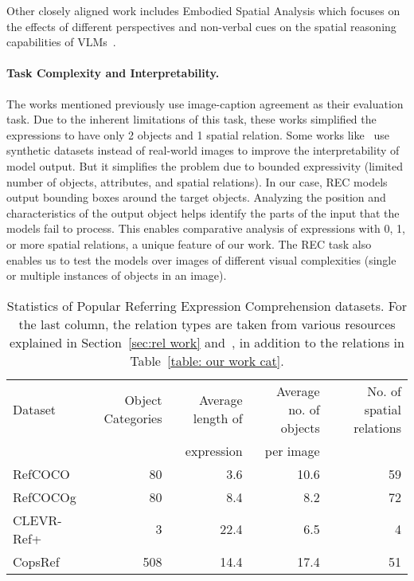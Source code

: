 Other closely aligned work includes Embodied Spatial Analysis which focuses on the effects of different perspectives and non-verbal cues on the spatial reasoning capabilities of VLMs~\cite{islam1,islam2}.
\noindent \paragraph{Task Complexity and Interpretability.} The works mentioned previously use image-caption agreement as their evaluation task. Due to the inherent limitations of this task, these works simplified the expressions to have only 2 objects and 1 spatial relation. Some works like~\cite{clipcdsm,subramaniamreclip,film} use synthetic datasets instead of real-world images to improve the interpretability of model output. But it simplifies the problem due to bounded expressivity (limited number of objects, attributes, and spatial relations). In our case, REC models output bounding boxes around the target objects. Analyzing the position and characteristics of the output object helps identify the parts of the input that the models fail to process. This enables comparative analysis of expressions with 0, 1, or more spatial relations, a unique feature of our work. The REC task also enables us to test the models over images of different visual complexities (single or multiple instances of objects in an image).
\begin{table*}[!ht]
\centering
\begin{tabular}{lrrrr}
\toprule
Dataset & Object Categories & Average length of & Average no. of objects & No. of spatial relations\\
 & & expression & per image & \\
\midrule
RefCOCO & 80 & 3.6 & 10.6 & 59 \\
RefCOCOg & 80 & 8.4 & 8.2 & 72 \\
CLEVR-Ref+ & 3 & 22.4 & 6.5 & 4 \\
CopsRef & 508 & 14.4 & 17.4 & 51 \\
\bottomrule
\end{tabular}
\caption{Statistics of Popular Referring Expression Comprehension datasets. For the last column, the relation types are taken from various resources explained in Section~\protect\ref{sec:rel work} and~\protect\cite{marchi}, in addition to the relations in Table~\protect\ref{table: our work cat}.}
\label{table: data-stats}
\end{table*}

